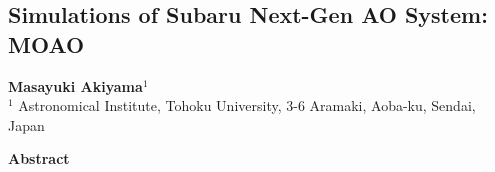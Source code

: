 



%

\def\thisdir{simulation/moao/}

\begin{center}

\noindent
\Large
\section{Simulations of Subaru Next-Gen AO System: MOAO
\label{sec:moao_simulation}}
\vspace{0.5cm}

\noindent
\large
{\bf Masayuki Akiyama$^1$}\\
$^1$ Astronomical Institute, Tohoku University, 3-6 Aramaki, Aoba-ku, Sendai, Japan
\vspace{0.5cm}

\noindent
\normalsize
{\bf Abstract}
\end{center}
\vspace{-0.2cm}

